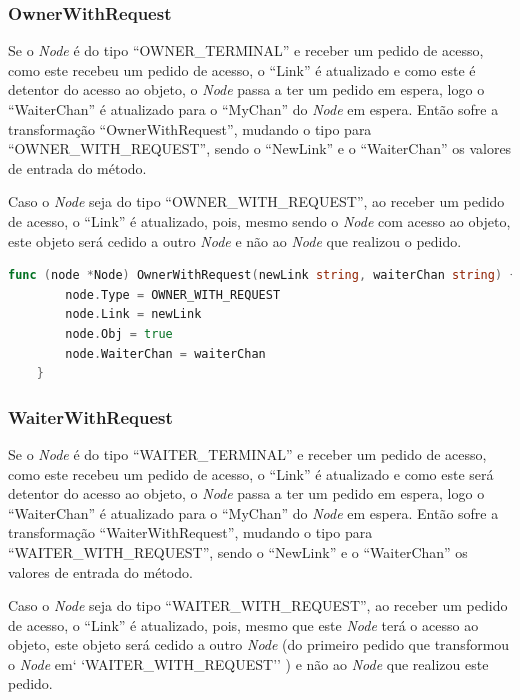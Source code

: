 \subsubsection*{OwnerWithRequest}

Se o \emph{Node} é do tipo ``OWNER\_TERMINAL'' e receber um pedido de acesso, 
como este recebeu um pedido de acesso, o ``Link'' é atualizado e
como este é detentor do acesso ao objeto, o \emph{Node} passa a ter um pedido em espera, logo o ``WaiterChan'' é atualizado para o ``MyChan'' do \emph{Node} em espera.
Então sofre a transformação ``OwnerWithRequest'', mudando o tipo para ``OWNER\_WITH\_REQUEST'', sendo o ``NewLink'' e o ``WaiterChan'' os valores de entrada do método.

Caso o \emph{Node} seja do tipo ``OWNER\_WITH\_REQUEST'', ao receber um pedido de acesso, 
o ``Link'' é atualizado, pois, mesmo sendo o \emph{Node} com acesso ao objeto, este objeto será cedido a outro \emph{Node} e não ao
\emph{Node} que realizou o pedido.

\begin{lstlisting}[caption={Método/transformação ``OwnerWithRequest''},language=Go]
	func (node *Node) OwnerWithRequest(newLink string, waiterChan string) {
		node.Type = OWNER_WITH_REQUEST
		node.Link = newLink
		node.Obj = true
		node.WaiterChan = waiterChan
	}


\end{lstlisting}

\subsubsection*{WaiterWithRequest}

Se o \emph{Node} é do tipo ``WAITER\_TERMINAL'' e receber um pedido de acesso, 
como este recebeu um pedido de acesso, o ``Link'' é atualizado e
como este será detentor do acesso ao objeto, o \emph{Node} passa a ter um pedido em espera, logo o ``WaiterChan'' é atualizado para o ``MyChan'' do \emph{Node} em espera.
Então sofre a transformação ``WaiterWithRequest'', mudando o tipo para ``WAITER\_WITH\_REQUEST'', sendo o ``NewLink'' e o ``WaiterChan'' os valores de entrada do método.

Caso o \emph{Node} seja do tipo ``WAITER\_WITH\_REQUEST'', ao receber um pedido de acesso, 
o ``Link'' é atualizado, pois, mesmo que este \emph{Node} terá o acesso ao objeto, este objeto será cedido a outro \emph{Node} (do primeiro pedido que transformou o \emph{Node} em` `WAITER\_WITH\_REQUEST'' ) 
e não ao
\emph{Node} que realizou este pedido.

